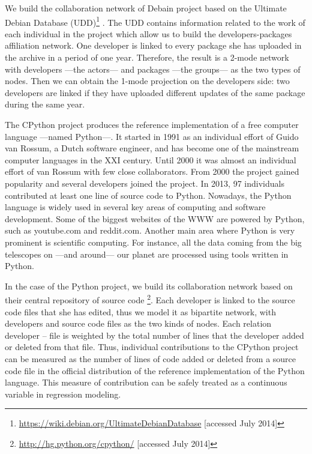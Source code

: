 We build the collaboration network of Debain project based on the Ultimate Debian Database (UDD)\footnote{\href{https://wiki.debian.org/UltimateDebianDatabase}{https://wiki.debian.org/UltimateDebianDatabase} [accessed July 2014]} \citep{udd:2010}. The UDD contains information related to the work of each individual in the project which allow us to build the developers-packages affiliation network. One developer is linked to every package she has uploaded in the archive in a period of one year. Therefore, the result is a 2-mode network with developers ---the actors--- and packages ---the groups--- as the two types of nodes. Then we can obtain the 1-mode projection on the developers side: two developers are linked if they have uploaded different updates of the same package during the same year.

The CPython project produces the reference implementation of a free computer language ---named Python---. It started in 1991 as an individual effort of Guido van Rossum, a Dutch software engineer, and has become one of the mainstream computer languages in the XXI century. Until 2000 it was almost an individual effort of van Rossum with few close collaborators. From 2000 the project gained popularity and several developers joined the project. In 2013, 97 individuals contributed at least one line of source code to Python. Nowadays, the Python language is widely used in several key areas of computing and software development. Some of the biggest websites of the WWW are powered by Python, such as youtube.com and reddit.com. Another main area where Python is very prominent is scientific computing. For instance, all the data coming from the big telescopes on ---and around--- our planet are processed using tools written in Python.

In the case of the Python project, we build its collaboration network based on their central repository of source code \footnote{\href{http://hg.python.org/cpython/}{http://hg.python.org/cpython/} [accessed July 2014]}. Each developer is linked to the source code files that she has edited, thus we model it as bipartite network, with developers and source code files as the two kinds of nodes. Each relation developer -- file is weighted by the total number of lines that the developer added or deleted from that file. Thus, individual contributions to the CPython project can be measured as the number of lines of code added or deleted from a source code file in the official distribution of the reference implementation of the Python language. This measure of contribution can be safely treated as a continuous variable in regression modeling.

